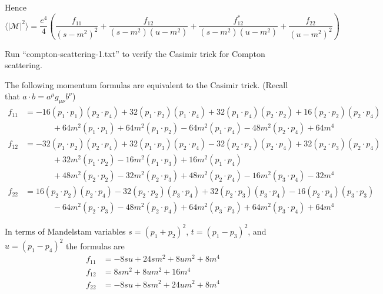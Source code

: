 \documentclass[12pt]{article}
\begin{document}
\noindent
Hence
\begin{equation}
\langle|\mathcal{M}|^2\rangle
=
\frac{e^4}{4}
\left(
\frac{f_{11}}{(s-m^2)^2}
+\frac{f_{12}}{(s-m^2)(u-m^2)}
+\frac{f_{12}^*}{(s-m^2)(u-m^2)}
+\frac{f_{22}}{(u-m^2)^2}
\right)
\end{equation}

\noindent
Run ``compton-scattering-1.txt'' to verify the Casimir trick for Compton scattering.

\bigskip
\noindent
The following momentum formulas are equivalent to the Casimir trick.
(Recall that $a\cdot b=a^\mu g_{\mu\nu}b^\nu$)
\begin{align*}
f_{11}&=
-16 (p_1 \cdot p_1) (p_2 \cdot p_4) +
 32 (p_1 \cdot p_2) (p_1 \cdot p_4) +
 32 (p_1 \cdot p_4) (p_2 \cdot p_2) +
 16 (p_2 \cdot p_2) (p_2 \cdot p_4) %
\\ &\phantom{=}\qquad{}+
 64 m^2 (p_1 \cdot p_1) +
 64 m^2 (p_1 \cdot p_2) -
 64 m^2 (p_1 \cdot p_4) -
 48 m^2 (p_2 \cdot p_4) + 64 m^4
\\
f_{12}&=
-32 (p_1 \cdot p_2) (p_2 \cdot p_4) +
 32 (p_1 \cdot p_3) (p_2 \cdot p_4) -
 32 (p_2 \cdot p_2) (p_2 \cdot p_4) +
 32 (p_2 \cdot p_3) (p_2 \cdot p_4) %
 \\ &\phantom{=}\qquad{}+
 32 m^2 (p_1 \cdot p_2) -
 16 m^2 (p_1 \cdot p_3) +
 16 m^2 (p_1 \cdot p_4) %
 \\ &\phantom{=}\qquad{}+
 48 m^2 (p_2 \cdot p_2) -
 32 m^2 (p_2 \cdot p_3) +
 48 m^2 (p_2 \cdot p_4) -
 16 m^2 (p_3 \cdot p_4) - 32 m^4
\\
f_{22}&=
16 (p_2 \cdot p_2) (p_2 \cdot p_4) -
32 (p_2 \cdot p_2) (p_3 \cdot p_4) +
32 (p_2 \cdot p_3) (p_3 \cdot p_4) -
16 (p_2 \cdot p_4) (p_3 \cdot p_3) %
\\ &\phantom{=}\qquad{}-
64 m^2 (p_2 \cdot p_3) -
48 m^2 (p_2 \cdot p_4) +
64 m^2 (p_3 \cdot p_3) +
64 m^2 (p_3 \cdot p_4) + 64 m^4
\end{align*}

\noindent
In terms of Mandelstam variables $s=(p_1+p_2)^2$, $t=(p_1-p_3)^2$, and $u=(p_1-p_4)^2$
the formulas are
\begin{equation}
\begin{aligned}
f_{11}&=-8 s u + 24 s m^2 + 8 u m^2 + 8 m^4
\\
f_{12}&=8 s m^2 + 8 u m^2 + 16 m^4
\\
f_{22}&=-8 s u + 8 s m^2 + 24 u m^2 + 8 m^4
\end{aligned}
\end{equation}
\end{document}
